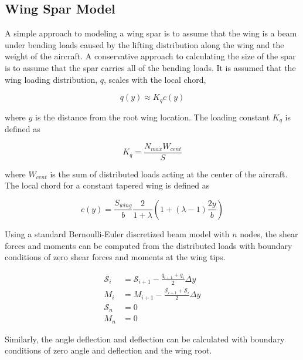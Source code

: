 \documentclass[]{aiaa-tc}%
\begin{document}
\subsection{Wing Spar Model}

A simple approach to modeling a wing spar is to assume that the wing is a beam under bending loads caused by the lifting distribution along the wing and the weight of the aircraft. 
A conservative approach to calculating the size of the spar is to assume that the spar carries all of the bending loads.  
It is assumed that the wing loading distribution, $q$, scales with the local chord,\cite{bending}

\begin{equation}
    \label{e:wingloading}
    q(y) \approx K_q c(y) 
\end{equation}

where $y$ is the distance from the root wing location. The loading constant $K_q$\cite{bending} is defined as

\begin{equation}
    \label{e:kq}
    K_q = \frac{N_{max}W_{cent}}{S}
\end{equation}

where $W_{cent}$ is the sum of distributed loads acting at the center of the aircraft. The local chord for a constant tapered wing\cite{bending} is defined as 

\begin{equation}
    \label{e:localchord}
    c(y) = \frac{S_{wing}}{b} \frac{2}{1+\lambda} \left( 1 + (\lambda - 1) \frac{2y}{b} \right)
\end{equation}

Using a standard Bernoulli-Euler discretized beam model with $n$ nodes, the shear forces and moments can be computed from the distributed loads with boundary conditions of zero shear forces and moments at the wing tips.\cite{bending}

\begin{align}
    \label{e:shear}
    \mathcal{S}_i &= \mathcal{S}_{i+1} - \frac{q_{i+1} + q_i}{2}\Delta y \\
    \label{e:moment}
    M_i &= M_{i+1} - \frac{\mathcal{S}_{i+1} + \mathcal{S}_i}{2}\Delta y \\
    \label{e:shearboundary}
    \mathcal{S}_n &= 0 \\
    \label{e:momentboundary}
    M_n &= 0
\end{align}

Similarly, the angle deflection and deflection can be calculated with boundary conditions of zero angle and deflection and the wing root.\cite{bending}
\end{document}
